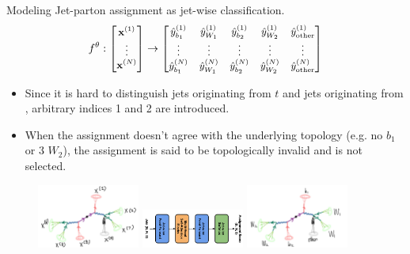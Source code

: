 \begin{frame}[fragile]{Modeling}
    Jet-parton assignment as jet-wise classification.\break
    \begin{equation*}
        \small
        f^{\theta}: 
        \begin{bmatrix}
            \mathbf{x}^{(1)} \\
            \vdots \\
            \mathbf{x}^{(N)}
        \end{bmatrix}
        \rightarrow
        \begin{bmatrix}
            \hat{y}^{(1)}_{b_{1}} & \hat{y}^{(1)}_{W_{1}} & \hat{y}^{(1)}_{b_{2}} & \hat{y}^{(1)}_{W_{2}} & \hat{y}^{(1)}_{\textrm{other}} \\
            \vdots & \vdots & \vdots & \vdots & \vdots \\
            \hat{y}^{(N)}_{b_{1}} & \hat{y}^{(N)}_{W_{1}} & \hat{y}^{(N)}_{b_{2}} & \hat{y}^{(N)}_{W_{2}} & \hat{y}^{(N)}_{\textrm{other}}
        \end{bmatrix}
    \end{equation*}
 
    \begin{itemize}
        \item {\footnotesize Since it is hard to distinguish jets originating
               from $t$ and jets originating from \PQt, arbitrary indices 1 and 2 are introduced.}
        \item {\footnotesize When the assignment doesn't agree with the underlying
               topology (e.g. no $b_{1}$ or 3 $ W_{2}$), the assignment is said
               to be topologically invalid and is not selected.}
    \end{itemize}

    \begin{figure}
        \centering
        \includegraphics[width=0.3\textwidth]{fig/model-cartoon/saja-input.jpg}
        \includegraphics[width=0.3\textwidth]{fig/model-cartoon/model-rot270.pdf}
        \includegraphics[width=0.3\textwidth]{fig/model-cartoon/saja-output.jpg}
    \end{figure}
\end{frame}

